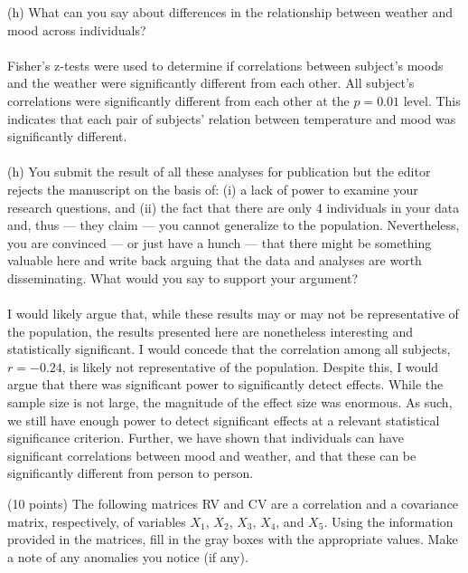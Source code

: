 \documentclass[onecolumn,10pt]{jhwhw}
\begin{document}
(h) What can you say about differences in the relationship between weather and mood across individuals?\\
\\
Fisher's z-tests were used to determine if correlations between subject's moods and the weather were significantly different from each other. All subject's correlations were significantly different from each other at the $p=0.01$ level. This indicates that each pair of subjects' relation between temperature and mood was significantly different.\\
\\
(h) You submit the result of all these analyses for publication but the editor rejects the manuscript on the basis of: (i) a lack of power to examine your research questions, and (ii) the fact that there are only 4 individuals in your data and, thus --- they claim --- you cannot generalize to the population. Nevertheless, you are convinced --- or just have a hunch --- that there might be something valuable here and write back arguing that the data and analyses are worth disseminating. What would you say to support your argument?\\
\\
I would likely argue that, while these results may or may not be representative of the population, the results presented here are nonetheless interesting and statistically significant. I would concede that the correlation among all subjects, $r=-0.24$, is likely not representative of the population. Despite this, I would argue that there was significant power to significantly detect effects. While the sample size is not large, the magnitude of the effect size was enormous. As such, we still have enough power to detect significant effects at a relevant statistical significance criterion. Further, we have shown that individuals can have significant correlations between mood and weather, and that these can be significantly different from person to person.

\clearpage
\problem{}
(10 points) The following matrices RV and CV are a correlation and a covariance matrix, respectively, of variables $X_1$, $X_2$, $X_3$, $X_4$, and $X_5$. Using the information provided in the matrices, fill in the gray boxes with the appropriate values. Make a note of any anomalies you notice (if any).
\end{document}
